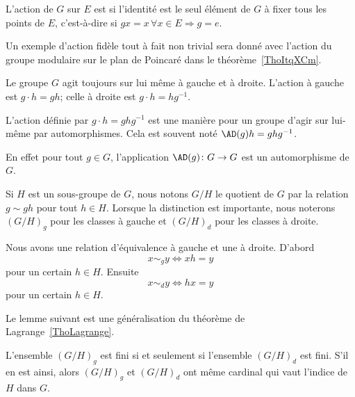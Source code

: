 \begin{definition}  \label{DefuyYJRh}
    L'action de \( G\) sur \( E\) est  si l'identité est le seul élément de \( G\) à fixer tous les points de \( E\), c'est-à-dire si \( gx=x\,\forall x\in E\Rightarrow g=e\).
\end{definition}

Un exemple d'action fidèle tout à fait non trivial sera donné avec l'action du groupe modulaire sur le plan de Poincaré dans le théorème~\ref{ThoItqXCm}.

Le groupe \( G\) agit toujours sur lui même à gauche et à droite. L'action à gauche est \( g\cdot h=gh\); celle à droite est \( g\cdot h=hg^{-1}\).

\begin{definition}      \label{DEFooCORTooEeOLPT}
    L'action  définie par \( g\cdot h=ghg^{-1}\) est une manière pour un groupe d'agir sur lui-même par automorphismes. Cela est souvent noté \( \AD(g)h=ghg^{-1}\).
\end{definition}
En effet pour tout \( g\in G\), l'application \( \AD(g)\colon G\to G\) est un automorphisme de \( G\).

Si \( H\) est un sous-groupe de  \( G\), nous notons \( G/H\) le quotient de $G$ par la relation \( g\sim gh\) pour tout \( h\in H\). Lorsque la distinction est importante, nous noterons \( (G/H)_g\) pour les classes à gauche et \( (G/H)_d\) pour les classes à droite.

Nous avons une relation d'équivalence à gauche et une à droite. D'abord
\begin{equation}
    x\sim_g y\Leftrightarrow xh=y
\end{equation}
pour un certain \( h\in H\). Ensuite
\begin{equation}
    x\sim_d y\Leftrightarrow hx=y
\end{equation}
pour un certain \( h\in H\).

Le lemme suivant est une généralisation du théorème de Lagrange~\ref{ThoLagrange}.

\begin{lemma}
    L'ensemble \( (G/H)_g\) est fini si et seulement si l'ensemble \( (G/H)_d\) est fini. S'il en est ainsi, alors \( (G/H)_g\) et \( (G/H)_d\) ont même cardinal qui vaut l'indice de \( H\) dans \( G\).
\end{lemma}

